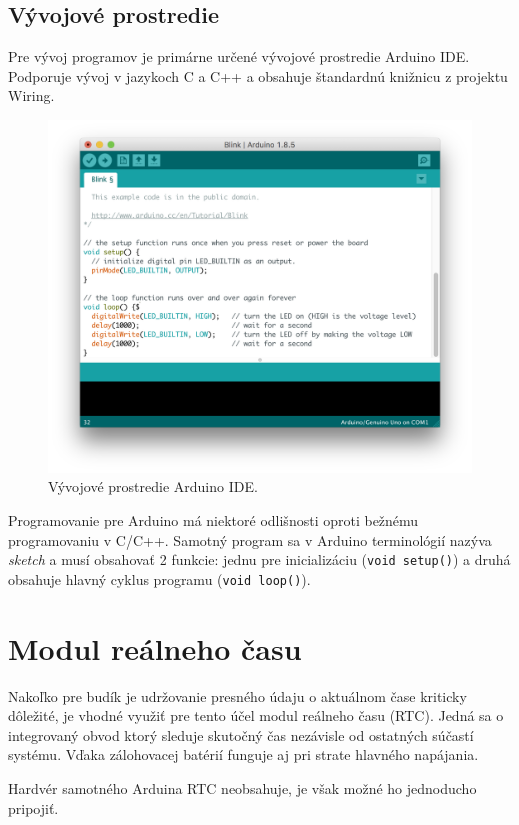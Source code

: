 \subsection{Vývojové prostredie}
Pre vývoj programov je primárne určené vývojové prostredie Arduino IDE. Podporuje vývoj v jazykoch C a C++ a obsahuje štandardnú knižnicu z projektu Wiring.

\begin{figure}
    \centering
    \includegraphics[width=\textwidth]{img/Arduino_IDE.png}
    \caption{Vývojové prostredie Arduino IDE.}
\end{figure}

Programovanie pre Arduino má niektoré odlišnosti oproti bežnému programovaniu v C/C++. Samotný program sa v Arduino terminológií nazýva \emph{sketch} a musí obsahovať 2 funkcie: jednu pre inicializáciu (\texttt{void setup()}) a druhá obsahuje hlavný cyklus programu (\texttt{void loop()}).

\section{Modul reálneho času}
Nakoľko pre budík je udržovanie presného údaju o aktuálnom čase kriticky dôležité, je vhodné využiť pre tento účel modul reálneho času (RTC). Jedná sa o integrovaný obvod ktorý sleduje skutočný čas nezávisle od ostatných súčastí systému. Vďaka zálohovacej batérií funguje aj pri strate hlavného napájania.

Hardvér samotného Arduina RTC neobsahuje, je však možné ho jednoducho pripojiť.
